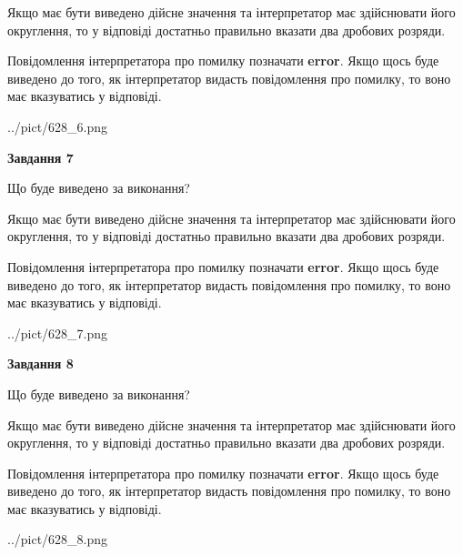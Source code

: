 \documentclass[12pt, ukrainian]{article}
\begin{document}
{\begin {Large}
Якщо має бути виведено дійсне значення та інтерпретатор має здійснювати його округлення, 
то у відповіді достатньо правильно вказати два дробових розряди.

Повідомлення інтерпретатора про помилку позначати \textbf{error}.
Якщо щось буде виведено до того, як інтерпретатор видасть повідомлення про помилку, 
то воно має вказуватись у відповіді. \par

\begin{center}
	{../pict/628_6.png}
\end{center}
\newpage

{\begin {center}\textbf{Завдання 7}\end {center}}\par
Що буде виведено за виконання? \par

Якщо має бути виведено дійсне значення та інтерпретатор має здійснювати його округлення, 
то у відповіді достатньо правильно вказати два дробових розряди.

Повідомлення інтерпретатора про помилку позначати \textbf{error}.
Якщо щось буде виведено до того, як інтерпретатор видасть повідомлення про помилку, 
то воно має вказуватись у відповіді. \par

\begin{center}
	{../pict/628_7.png}
\end{center}
\newpage

{\begin {center}\textbf{Завдання 8}\end {center}}\par
Що буде виведено за виконання? \par

Якщо має бути виведено дійсне значення та інтерпретатор має здійснювати його округлення, 
то у відповіді достатньо правильно вказати два дробових розряди.

Повідомлення інтерпретатора про помилку позначати \textbf{error}.
Якщо щось буде виведено до того, як інтерпретатор видасть повідомлення про помилку, 
то воно має вказуватись у відповіді. \par

\begin{center}
	{../pict/628_8.png}
\end{center}
\newpage


\end{Large}}
\end{document}
